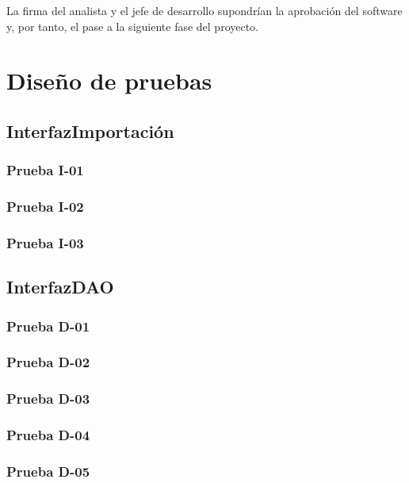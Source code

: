 \documentclass[10pt,a4paper]{article}
\begin{document}
		La firma del analista y el jefe de desarrollo supondrían la aprobación del software y, por tanto, el pase a la siguiente fase del proyecto.


\section{Diseño de pruebas}
	\subsection{InterfazImportación}
			\subsubsection{Prueba I-01}

			\subsubsection{Prueba I-02}

			\subsubsection{Prueba I-03}

	\subsection{InterfazDAO}
			\subsubsection{Prueba D-01}

			\subsubsection{Prueba D-02}

			\subsubsection{Prueba D-03}

			\subsubsection{Prueba D-04}

			\subsubsection{Prueba D-05}
\end{document}
